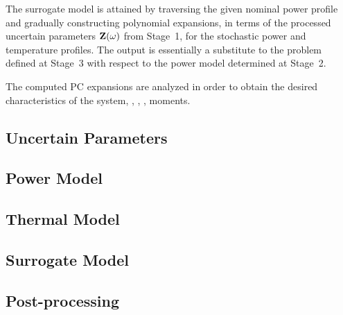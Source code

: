  The surrogate model is attained by traversing the given nominal power profile and gradually constructing polynomial expansions, in terms of the processed uncertain parameters $\mathbf{Z}(\omega)$ from Stage~1, for the stochastic power and temperature profiles. The output is essentially a substitute to the problem defined at Stage~3 with respect to the power model determined at Stage~2.

 The computed PC expansions are analyzed in order to obtain the desired characteristics of the system, \eg, \cdfs, \pdfs, moments.

\subsection{Uncertain Parameters} 


\subsection{Power Model} 


\subsection{Thermal Model} 


\subsection{Surrogate Model} 


\subsection{Post-processing} 


